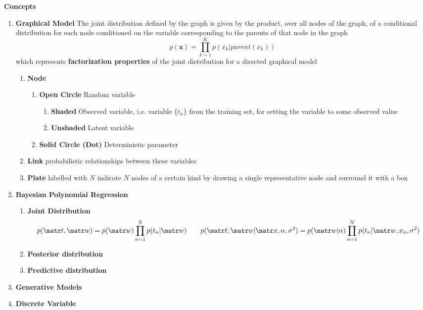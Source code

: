 \documentclass[11pt]{article}
\begin{document}
\begin{defn*}
    \textbf{Concepts}
    \begin{enumerate}
        \item \textbf{Graphical Model} The joint distribution defined by the graph is given by the product, over all nodes of the graph, of a conditional distribution for each node conditioned on the variable corresponding to the parents of that node in the graph
        \[
            p(\mathbf{x}) = \prod_{k=1}^K p(x_k | parent(x_k))
        \]
        which represents \textbf{factorization properties} of the joint distribution for a directed graphical model
        \begin{enumerate}
            \item \textbf{Node} 
            \begin{enumerate}
                \item \textbf{Open Circle} Random variable 
                \begin{enumerate}
                    \item \textbf{Shaded} Observed variable, i.e. variable $\{t_n\}$ from the training set, for setting the variable to some observed value
                    \item \textbf{Unshaded} Latent variable
                \end{enumerate}
                \item \textbf{Solid Circle (Dot)} Deterministic parameter 
            \end{enumerate}
            \item \textbf{Link} probabilistic relationships between these variables
            \item \textbf{Plate} labelled with $N$ indicate $N$ nodes of a certain kind by drawing a single representative node and surround it with a box
        \end{enumerate}
        \item \textbf{Bayesian Polynomial Regression}
        \begin{enumerate}
            \item \textbf{Joint Distribution}
            \[
                p(\bt,\bw) = p(\bw) \prod_{n=1}^N p(t_n | \bw)
                \qquad 
                p(\bt,\bw| \bx, \alpha, \sigma^2) = p(\bw|\alpha) \prod_{n=1}^N p(t_n |\bw, x_n, \sigma^2)
            \]
            \item \textbf{Posterior distribution}
            \item \textbf{Predictive distribution}
        \end{enumerate}
        \item \textbf{Generative Models}
        \item \textbf{Discrete Variable}
    \end{enumerate}
\end{defn*}
\end{document}
